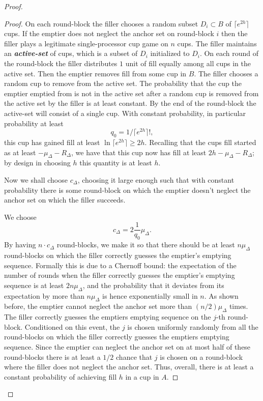 \documentclass[twocolumn]{article}[10pt]
\newcommand{\defn}[1]{{\textit{\textbf{\boldmath #1}}}\xspace}
\begin{document}
\begin{proof}
\begin{proof}
  On each round-block the filler chooses a random subset $D_i \subset B$ of
  $\lceil e^{2h} \rceil$ cups. If the emptier does not neglect the anchor set
  on round-block $i$ then the filler plays a legitimate single-processor cup
  game on $n$ cups. The filler maintains an \defn{active-set} of cups, which is
  a subset of $D_i$ initialized to $D_i$. On each round of the round-block the
  filler distributes $1$ unit of fill equally among all cups in the active set.
  Then the emptier removes fill from some cup in $B$. The filler chooses a
  random cup to remove from the active set. The probability that the cup the
  emptier emptied from is not in the active set after a random cup is removed
  from the active set by the filler is at least constant. By the end of the
  round-block the active-set will consist of a single cup. With constant
  probability, in particular probability at least $$q_0 = 1/\lceil e^{2h}
  \rceil!,$$ this cup has gained fill at least $\ln \lceil e^{2h} \rceil \ge
  2h$. Recalling that the cups fill started as at least $-\mu_\Delta-R_\Delta$,
  we have that this cup now has fill at least $2h-\mu_\Delta-R_\Delta$; by
  design in choosing $h$ this quantity is at least $h$. 

  Now we shall choose $c_\Delta$, choosing it large enough such that with
  constant probability there is some round-block on which the emptier doesn't
  neglect the anchor set on which the filler succeeds.

  We choose $$c_\Delta = 2\frac{1}{q_0}\mu_\Delta.$$ By having $n\cdot
  c_\Delta$ round-blocks, we make it so that there should be at least
  $n\mu_\Delta$ round-blocks on which the filler correctly guesses the
  emptier's emptying sequence. Formally this is due to a Chernoff bound: the
  expectation of the number of rounds when the filler correctly guesses the
  emptier's emptying sequence is at least $2n\mu_\Delta$, and the probability
  that it deviates from its expectation by more than $n\mu_\Delta$ is hence
  exponentially small in $n$. As shown before, the emptier cannot neglect the
  anchor set more than $(n/2)\mu_\Delta$ times. The filler correctly guesses
  the emptiers emptying sequence on the $j$-th round-block. Conditioned on this
  event, the $j$ is chosen uniformly randomly from all the round-blocks on
  which the filler correctly guesses the emptiers emptying sequence. Since the
  emptier can neglect the anchor set on at most half of these round-blocks
  there is at least a $1/2$ chance that $j$ is chosen on a round-block where
  the filler does not neglect the anchor set. Thus, overall, there is at least a
  constant probability of achieving fill $h$ in a cup in $A$.


\end{proof}
\end{proof}
\end{document}
